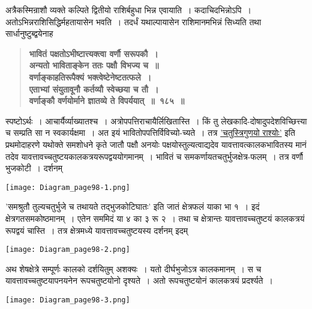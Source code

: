 \documentclass[11pt, openany]{book}
\begin{document}
\begin{sloppypar}
{\small अत्रैकस्मिन्राशौ व्यक्ते कल्पिते द्वितीयो राशिर्बहुधा भिन्न एवायाति~। कदाचिदभिन्नोऽपि~। अतोऽभिन्नराशिसिद्धिर्महतायासेन भवति~। तदर्धं यथाल्पायासेन राशिमानमभिन्नं सिध्यति तथा सार्धानुष्टुब्द्वयेनाह\textendash }

 \label{11.185}
\begin{quote}
{\large \textbf{{\color{purple}भावितं पक्षतोऽभीष्टात्त्यक्त्वा वर्णौ सरूपकौ~।\\
अन्यतो भाविताङ्केन ततः पक्षौ विभज्य च~॥\\
वर्णाङ्काहतिरूपैक्यं भक्त्वेष्टेनेष्टतत्फले~।\\
एताभ्यां संयुतावूनौ कर्तव्यौ स्वेच्छया च तौ~।\\
वर्णाङ्कौ वर्णयोर्माने ज्ञातव्ये ते विपर्ययात्~॥~१८५~॥}}}
\end{quote}
\end{sloppypar}

\newpage

\begin{sloppypar}
स्पष्टोऽर्थः~। आचार्यैर्व्याख्यातश्च~। अत्रोपपत्तिराचायैर्लिखितास्ति~। किं तु लेखकादि-दोषादुपदेशविच्छित्त्या च सम्प्रति सा न स्वकार्यक्षमा~। अत इयं भावितोपपत्तिर्विविच्यो-च्यते~। तत्र \hyperref[11.182]{'चतुस्त्रिगुणयो राश्योः'} इति प्रथमोदाहरणे यथोक्ते समशोधने कृते जातौ पक्षौ  अनयोः पक्षयोस्तुल्यत्वाद्यदेव यावत्तावत्कालकभावितस्य मानं तदेव यावत्तावच्चतुष्टयकालकत्रयरूपद्वययोगमानम्~। भावितं च समकर्णायतचतुर्भुजक्षेत्र-फलम्~। तत्र वर्णौ भुजकोटी~। दर्शनम्

\begin{center}
\texttt{[image: Diagram\_page98-1.png]}
\end{center}

{\color{violet}'समश्रुतौ तुल्यचतुर्भुजे च तथायते तद्भुजकोटिघातः'} इति जातं क्षेत्रफलं याका भा १~। इदं क्षेत्रगतसमकोष्ठमानम्~। एतेन सममिदं या ४ का ३ रू २~। तथा च क्षेत्रान्तः यावत्तावच्चतुष्टयं कालकत्रयं रूपद्वयं चास्ति~। तत्र क्षेत्रमध्ये यावत्तावच्चतुष्टयस्य दर्शनम् इदम्

\begin{center}
\texttt{[image: Diagram\_page98-2.png]}
\end{center}

अथ शेषक्षेत्रे सम्पूर्णः कालको दर्शयितुम् अशक्यः~। यतो दीर्घभुजोऽत्र कालकमानम्~। स च यावत्तावच्चतुष्टयापनयनेन रूपचतुष्टयोनो दृश्यते~। अतो रूपचतुष्टयोनं कालकत्रयं प्रदर्श्यते~।

\begin{center}
\texttt{[image: Diagram\_page98-3.png]}
\end{center}
\end{sloppypar}
\end{document}
